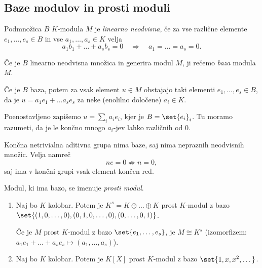 \subsection{Baze modulov in prosti moduli}

\begin{definicija}
    Podmnožica $B$ $K$-modula $M$ je \emph{linearno neodvisna}, če 
    za vse različne elemente $e_1, \dots, e_s \in B$ in vse $a_1, \dots, a_s \in K$ velja
    \[
        a_1b_1 + \dots + a_sb_s = 0 \quad \Rightarrow \quad a_1 = \dots = a_s = 0.
    \]
\end{definicija}

\begin{definicija}
    Če je $B$ linearno neodvisna množica in generira modul $M$, ji rečemo \emph{baza}
    modula $M$.
\end{definicija}

Če je $B$ baza, potem za vsak element $u \in M$ obstajajo taki elementi $e_1, \dots, e_s \in B$,
da je $u = a_1e_1 + \dots a_se_s$ za neke (enolilno določene) $a_i \in K$.

Poenostavljeno zapišemo $u = \sum_i a_i e_i$, kjer je $B = \set{e_i}_i$. Tu moramo razumeti, 
da je le končno mnogo $a_i$-jev lahko različnih od $0$.

\begin{primer}
    Končna netrivialna aditivna grupa nima baze, saj nima nepraznih neodvisnih množic. Velja namreč
    \[
        ne = 0 \not\Rightarrow n = 0, 
    \]
    saj ima v končni grupi vsak element končen red.
\end{primer}

\begin{definicija}
    Modul, ki ima bazo, se imenuje \emph{prosti modul}.
\end{definicija}

\begin{primer}
    \begin{enumerate}
        \item Naj bo $K$ kolobar. Potem je $K^s = K \oplus \dots \oplus K$ prost $K$-modul 
        z bazo $\set{(1,0,\dots,0), (0, 1, 0, \dots, 0), (0,\dots,0,1)}$. 

        Če je $M$ prost $K$-modul z bazo $\set{e_1, \dots, e_s}$, je $M \cong K^s$ 
        (izomorfizem: $a_1e_1 + \dots + a_se_s \mapsto (a_1, \dots, a_s)$).

        \item Naj bo $K$ kolobar. Potem je $K[X]$ prost $K$-modul z bazo $\set{1, x, x^2, \dots}$.
    \end{enumerate}
\end{primer}

